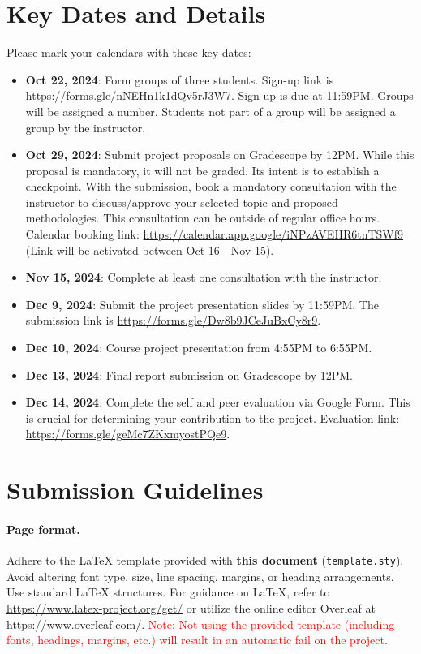 \documentclass{article}
\begin{document}
\section{Key Dates and Details}
Please mark your calendars with these key dates:
\begin{itemize}
  \item \textbf{Oct 22, 2024}: Form groups of three students. Sign-up link is \url{https://forms.gle/nNEHn1k1dQv5rJ3W7}. Sign-up is due at 11:59PM. Groups will be assigned a number. Students not part of a group will be assigned a group by the instructor.
  \item \textbf{Oct 29, 2024}: Submit project proposals on Gradescope by 12PM. While this proposal is mandatory, it will not be graded. Its intent is to establish a checkpoint. With the submission, book a mandatory consultation with the instructor to discuss/approve your selected topic and proposed methodologies. This consultation can be outside of regular office hours. Calendar booking link: \url{https://calendar.app.google/iNPzAVEHR6tnTSWf9} (Link will be activated between Oct 16 - Nov 15).
  \item \textbf{Nov 15, 2024}: Complete at least one consultation with the instructor.
  \item \textbf{Dec 9, 2024}: Submit the project presentation slides by 11:59PM. The submission link is \url{https://forms.gle/Dw8b9JCeJuBxCy8r9}.
  \item \textbf{Dec 10, 2024}: Course project presentation from 4:55PM to 6:55PM.
  \item \textbf{Dec 13, 2024}: Final report submission on Gradescope by 12PM.
  \item \textbf{Dec 14, 2024}: Complete the self and peer evaluation via Google Form. This is crucial for determining your contribution to the project. Evaluation link: \url{https://forms.gle/geMc7ZKxmyostPQe9}.
\end{itemize}

\section{Submission Guidelines}
\paragraph{Page format.} Adhere to the LaTeX template provided with \textbf{this document} (\texttt{template.sty}). Avoid altering font type, size, line spacing, margins, or heading arrangements. Use standard LaTeX structures. For guidance on LaTeX, refer to \url{https://www.latex-project.org/get/} or utilize the online editor Overleaf at \url{https://www.overleaf.com/}. \textcolor{red}{Note: Not using the provided template (including fonts, headings, margins, etc.) will result in an automatic fail on the project.}
\end{document}
